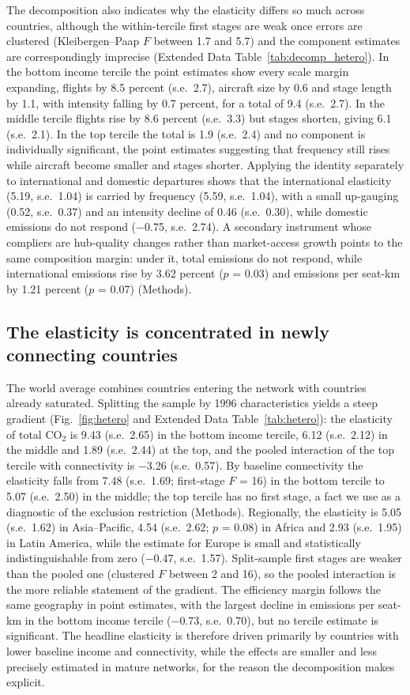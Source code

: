\documentclass[12pt]{article}
\begin{document}
The decomposition also indicates why the elasticity differs so much
across countries, although the within-tercile first stages are weak once
errors are clustered (Kleibergen--Paap $F$ between 1.7 and 5.7) and the
component estimates are correspondingly imprecise (Extended Data
Table~\ref{tab:decomp_hetero}). In the bottom income tercile the point
estimates show every scale margin expanding, flights by 8.5 percent (s.e.\
2.7), aircraft size by 0.6 and stage length by 1.1, with intensity falling
by 0.7 percent, for a total of 9.4 (s.e.\ 2.7). In the middle tercile
flights rise by 8.6 percent (s.e.\ 3.3) but stages shorten, giving 6.1
(s.e.\ 2.1). In the top tercile the total is 1.9 (s.e.\ 2.4) and no
component is individually significant, the point estimates suggesting
that frequency still rises while aircraft become smaller and stages
shorter. Applying the identity separately to international and domestic
departures shows that the international elasticity (5.19, s.e.\ 1.04) is
carried by frequency (5.59, s.e.\ 1.04), with a small up-gauging (0.52,
s.e.\ 0.37) and an intensity decline of 0.46 (s.e.\ 0.30), while domestic
emissions do not respond ($-$0.75, s.e.\ 2.74). A secondary instrument whose compliers are
hub-quality changes rather than market-access growth points to the same
composition margin: under it, total emissions do not respond, while
international emissions rise by 3.62 percent ($p$ = 0.03) and emissions per
seat-km by 1.21 percent ($p$ = 0.07) (Methods).

\subsection*{The elasticity is concentrated in newly connecting countries}
The world average combines countries entering the network with countries
already saturated. Splitting the sample by 1996 characteristics yields a
steep gradient (Fig.~\ref{fig:hetero} and Extended Data
Table~\ref{tab:hetero}): the elasticity of total CO$_2$ is 9.43 (s.e.\
2.65) in the bottom income tercile, 6.12 (s.e.\ 2.12) in the middle and
1.89 (s.e.\ 2.44) at the top, and the pooled interaction of the top
tercile with connectivity is $-$3.26 (s.e.\ 0.57). By baseline
connectivity the elasticity falls from 7.48 (s.e.\ 1.69; first-stage $F$ =
16) in the bottom tercile to 5.07 (s.e.\ 2.50) in the middle; the top
tercile has no first stage, a fact we use as a diagnostic of
the exclusion restriction (Methods). Regionally, the elasticity is 5.05 (s.e.\ 1.62) in Asia--Pacific, 4.54 (s.e.\ 2.62; $p$ = 0.08) in Africa and
2.93 (s.e.\ 1.95) in Latin America,
while the estimate for Europe is small and statistically
indistinguishable from zero ($-$0.47, s.e.\ 1.57). Split-sample first stages are
weaker than the pooled one (clustered $F$ between 2 and 16), so the pooled
interaction is the more reliable statement of the gradient. The efficiency
margin follows the same geography in point estimates, with the largest
decline in emissions per seat-km in the bottom income tercile ($-$0.73,
s.e.\ 0.70), but no tercile estimate is significant. The headline elasticity is therefore driven primarily by
countries with lower baseline income and connectivity, while the effects
are smaller and less precisely estimated in mature networks, for the
reason the decomposition makes explicit.
\end{document}
